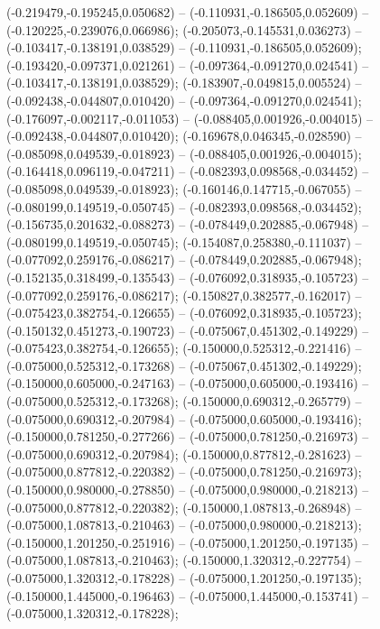  (-0.219479,-0.195245,0.050682) -- (-0.110931,-0.186505,0.052609) -- (-0.120225,-0.239076,0.066986);
 (-0.205073,-0.145531,0.036273) -- (-0.103417,-0.138191,0.038529) -- (-0.110931,-0.186505,0.052609);
 (-0.193420,-0.097371,0.021261) -- (-0.097364,-0.091270,0.024541) -- (-0.103417,-0.138191,0.038529);
 (-0.183907,-0.049815,0.005524) -- (-0.092438,-0.044807,0.010420) -- (-0.097364,-0.091270,0.024541);
 (-0.176097,-0.002117,-0.011053) -- (-0.088405,0.001926,-0.004015) -- (-0.092438,-0.044807,0.010420);
 (-0.169678,0.046345,-0.028590) -- (-0.085098,0.049539,-0.018923) -- (-0.088405,0.001926,-0.004015);
 (-0.164418,0.096119,-0.047211) -- (-0.082393,0.098568,-0.034452) -- (-0.085098,0.049539,-0.018923);
 (-0.160146,0.147715,-0.067055) -- (-0.080199,0.149519,-0.050745) -- (-0.082393,0.098568,-0.034452);
 (-0.156735,0.201632,-0.088273) -- (-0.078449,0.202885,-0.067948) -- (-0.080199,0.149519,-0.050745);
 (-0.154087,0.258380,-0.111037) -- (-0.077092,0.259176,-0.086217) -- (-0.078449,0.202885,-0.067948);
 (-0.152135,0.318499,-0.135543) -- (-0.076092,0.318935,-0.105723) -- (-0.077092,0.259176,-0.086217);
 (-0.150827,0.382577,-0.162017) -- (-0.075423,0.382754,-0.126655) -- (-0.076092,0.318935,-0.105723);
 (-0.150132,0.451273,-0.190723) -- (-0.075067,0.451302,-0.149229) -- (-0.075423,0.382754,-0.126655);
 (-0.150000,0.525312,-0.221416) -- (-0.075000,0.525312,-0.173268) -- (-0.075067,0.451302,-0.149229);
 (-0.150000,0.605000,-0.247163) -- (-0.075000,0.605000,-0.193416) -- (-0.075000,0.525312,-0.173268);
 (-0.150000,0.690312,-0.265779) -- (-0.075000,0.690312,-0.207984) -- (-0.075000,0.605000,-0.193416);
 (-0.150000,0.781250,-0.277266) -- (-0.075000,0.781250,-0.216973) -- (-0.075000,0.690312,-0.207984);
 (-0.150000,0.877812,-0.281623) -- (-0.075000,0.877812,-0.220382) -- (-0.075000,0.781250,-0.216973);
 (-0.150000,0.980000,-0.278850) -- (-0.075000,0.980000,-0.218213) -- (-0.075000,0.877812,-0.220382);
 (-0.150000,1.087813,-0.268948) -- (-0.075000,1.087813,-0.210463) -- (-0.075000,0.980000,-0.218213);
 (-0.150000,1.201250,-0.251916) -- (-0.075000,1.201250,-0.197135) -- (-0.075000,1.087813,-0.210463);
 (-0.150000,1.320312,-0.227754) -- (-0.075000,1.320312,-0.178228) -- (-0.075000,1.201250,-0.197135);
 (-0.150000,1.445000,-0.196463) -- (-0.075000,1.445000,-0.153741) -- (-0.075000,1.320312,-0.178228);
